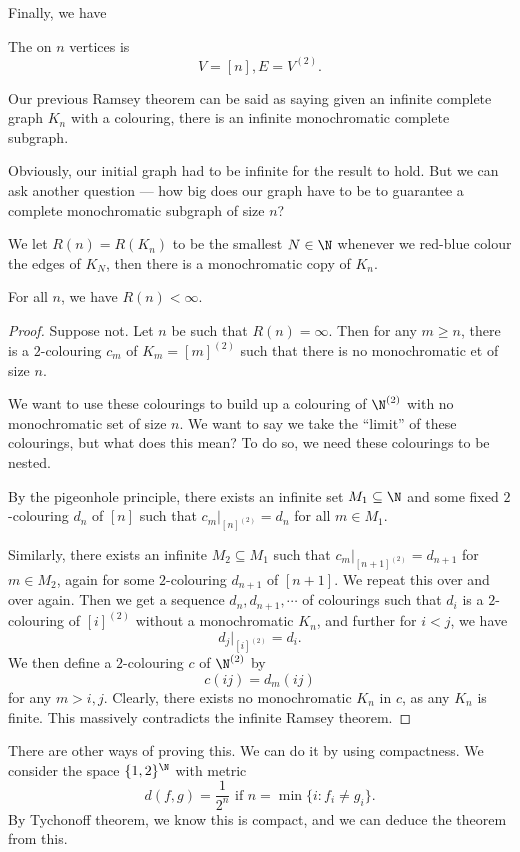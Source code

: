 \documentclass[a4paper]{article}
\begin{document}
Finally, we have
\begin{eg}
  The   on $n$ vertices is
  \[
    V = [n], E = V^{(2)}.
  \]
\end{eg}

Our previous Ramsey theorem can be said as saying given an infinite complete graph $K_n$ with a colouring, there is an infinite monochromatic complete subgraph.

Obviously, our initial graph had to be infinite for the result to hold. But we can ask another question --- how big does our graph have to be to guarantee a complete monochromatic subgraph of size $n$?
\begin{defi}
  We let $R(n) = R(K_n)$ to be the smallest $N \in \N$ whenever we red-blue colour the edges of $K_N$, then there is a monochromatic copy of $K_n$.
\end{defi}

\begin{thm} %
  For all $n$, we have $R(n) < \infty$.
\end{thm}

\begin{proof}
  Suppose not. Let $n$ be such that $R(n) = \infty$. Then for any $m \geq n$, there is a $2$-colouring $c_m$ of $K_m = [m]^{(2)}$ such that there is no monochromatic et of size $n$.

  We want to use these colourings to build up a colouring of $\N^{(2)}$ with no monochromatic set of size $n$. We want to say we take the ``limit'' of these colourings, but what does this mean? To do so, we need these colourings to be nested.

  By the pigeonhole principle, there exists an infinite set $M_1 \subseteq \N$ and some fixed $2$-colouring $d_n$ of $[n]$ such that $c_m|_{[n]^{(2)}} = d_n$ for all $m \in M_1$.

  Similarly, there exists an infinite $M_2 \subseteq M_1$ such that $c_m|_{[n + 1]^{(2)}} = d_{n + 1}$ for $m \in M_2$, again for some $2$-colouring $d_{n + 1}$ of $[n + 1]$. We repeat this over and over again. Then we get a sequence $d_n, d_{n + 1}, \cdots$ of colourings such that $d_i$ is a $2$-colouring of $[i]^{(2)}$ without a monochromatic $K_n$, and further for $i < j$, we have
  \[
    d_j|_{[i]^{(2)}} = d_i.
  \]
  We then define a $2$-colouring $c$ of $\N^{(2)}$ by
  \[
    c(ij) = d_m(ij)
  \]
  for any $m > i, j$. Clearly, there exists no monochromatic $K_n$ in $c$, as any $K_n$ is finite. This massively contradicts the infinite Ramsey theorem.
\end{proof}
There are other ways of proving this. We can do it by using compactness. We consider the space $\{1, 2\}^\N$ with metric
\[
  d(f, g) = \frac{1}{2^n}\text{ if } n = \min \{i: f_i \not= g_i\}.
\]
By Tychonoff theorem, we know this is compact, and we can deduce the theorem from this. %
\end{document}
